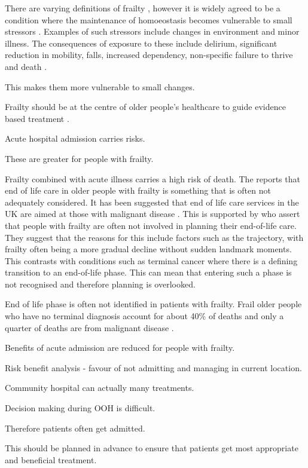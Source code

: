 \documentclass
[
	12pt,
	a4paper,
	oneside,
]{report}
\begin{document}
There are varying definitions of frailty \parencite{soong:15}, however it is 
widely agreed to be a condition where the maintenance of homoeostasis 
becomes vulnerable to  small stressors \parencite{vellas:16}. Examples of such 
stressors include changes in environment and minor illness. The consequences of 
exposure to these include delirium, significant reduction in mobility,
falls, increased dependency, non-specific failure to thrive and death 
\parencite{bgs:14,oliver:14,vellas:16}.

This makes them more vulnerable to small changes.

Frailty should be at the centre of older people's healthcare to guide evidence
based treatment \parencite{woo:14}.

Acute hospital admission carries risks.

These are greater for people with frailty.

Frailty combined with acute illness carries a high risk of death. 
The \textcite{silver:12} reports that end of life care in older people with frailty
is something that is often not adequately considered. It has been suggested that 
end of life care services in the UK are aimed at those with malignant 
disease \parencite{sharp:13}.
This is supported by \textcite{oliver:14} who assert that people with frailty 
are often not involved in planning their 
end-of-life care. They suggest that the reasons for this include factors such as
the trajectory, with frailty often being a more gradual decline without sudden 
landmark moments. This contrasts with conditions such as terminal cancer where there 
is a defining transition to an end-of-life phase. This can mean that entering such a
phase is not recognised and therefore planning is overlooked. 


End of life phase is often not identified in patients with frailty. 
Frail older people who have no terminal diagnosis account for about 40\% of 
deaths and only a quarter of deaths are from malignant disease \parencite{sharp:13}.

Benefits of acute admission are reduced for people with frailty.

Risk benefit analysis - favour of not admitting and managing in current location.

Community hospital can actually many treatments.

Decision making during OOH is difficult.

Therefore patients often get admitted.

This should be planned in advance to ensure that patients get most appropriate 
and beneficial treatment. 
\end{document}
